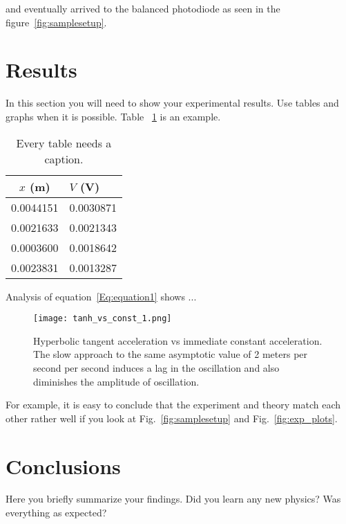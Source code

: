 \documentclass[letterpaper,12pt]{article}
\begin{document}
and eventually arrived to the
balanced photodiode as seen in the figure~\ref{fig:samplesetup}.


\section{Results}

In this section you will need to show your experimental results. Use tables and
graphs when it is possible. Table ~\ref{tbl:bins} is an example.


\begin{table}[!hbp]
\begin{center}
\caption{Every table needs a caption.}
\label{tbl:bins} %
\begin{tabular}{cc} 
\hline
\multicolumn{1}{c}{$x$ (m)} & \multicolumn{1}{l}{$V$ (V)} \\
\hline
0.0044151 &   0.0030871 \\
0.0021633 &   0.0021343 \\
0.0003600 &   0.0018642 \\
0.0023831 &   0.0013287 \\
\hline
\end{tabular}
\end{center}
\end{table}

Analysis of equation~\ref{Eq:equation1} shows ...

\blindtext

\begin{figure}
    \centering
    \texttt{[image: tanh\_vs\_const\_1.png]}
    \caption{Hyperbolic tangent acceleration vs immediate constant acceleration. The slow approach to the same asymptotic value of 2 meters per second per second induces a lag in the oscillation and also diminishes the amplitude of oscillation.}
\end{figure}

For example, it is easy to conclude that the
experiment and theory match each other rather well if you look at
Fig.~\ref{fig:samplesetup} and Fig.~\ref{fig:exp_plots}.


\section{Conclusions}
Here you briefly summarize your findings. Did you learn any new physics? Was everything as expected?
\end{document}
